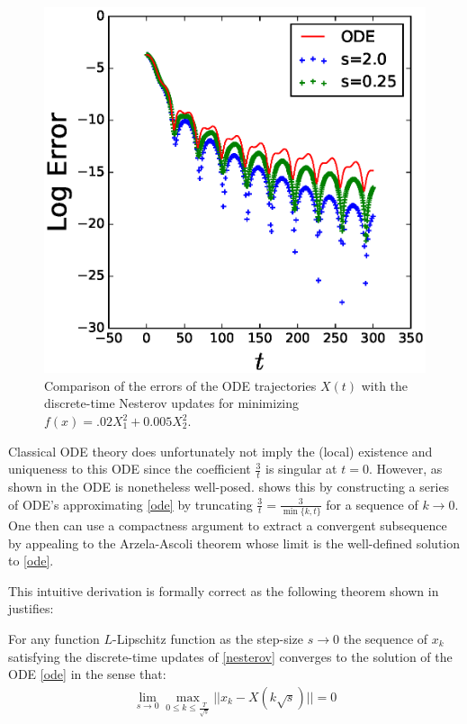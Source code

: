 \begin{figure}[!h]
\begin{center}
\includegraphics[width=0.5\linewidth]{Experiments/quadratic_errors_compare_annealed.eps}
\caption{Comparison of the errors of the ODE trajectories $X(t)$ with the discrete-time Nesterov updates for minimizing $f(x) = .02 X_1^2 + 0.005 X_2^2$.}
\end{center}
\end{figure}

Classical ODE theory does unfortunately not imply the (local) existence and uniqueness to this ODE since the coefficient $\frac{3}{t}$ is singular at $t=0$. However, as shown in \cite{su2014differential} the ODE is nonetheless well-posed. \cite{su2014differential} shows this by constructing a series of ODE's approximating \eqref{ode} by truncating $\frac{3}{t} = \frac{3}{\min \{ k, t \}}$ for a sequence of $k\to 0$. One then can use a compactness argument to extract a convergent subsequence by appealing to the Arzela-Ascoli theorem whose limit is the well-defined solution to \eqref{ode}.

This intuitive derivation is formally correct as the following theorem shown in \cite{su2014differential} justifies:
\begin{theorem}
    For any function $L$-Lipschitz function as the step-size $s \to 0$ the sequence of $x_k$ satisfying the discrete-time updates of \eqref{nesterov} converges to the solution of the ODE \eqref{ode} in the sense that: \\
    \begin{align}
    \lim_{s \to 0} \max_{0 \leq k \leq \frac{T}{\sqrt{s}}} ||x_k-X(k\sqrt{s})|| = 0
    \end{align}
\end{theorem}

